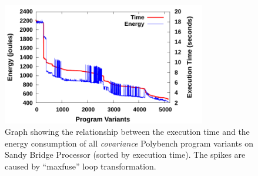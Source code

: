 


\begin{figure}[bt]
    \includegraphics[width=3.5in]{Covariance}
    \caption{Graph showing the relationship between the execution time and the
energy consumption of all \emph{covariance} Polybench program variants on Sandy 
Bridge Processor (sorted by execution time). The spikes are caused by ``maxfuse''
loop transformation.}
    \label{fig:TE}
\end{figure}

